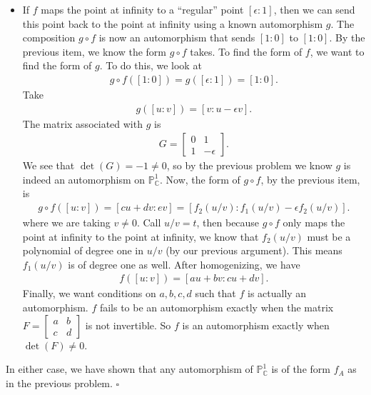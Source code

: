 \documentclass[12pt]{article}
\newcommand{\C}{\mathbb{C}}
\begin{document}
\begin{itemize}
\item If $f$ maps the point at infinity to a ``regular'' point $[\epsilon:1]$, then we can send this point back to the point at infinity using a known automorphism $g$. The composition $g\circ f$ is now an automorphism that sends $[1:0]$ to $[1:0]$. By the previous item, we know the form $g\circ f$ takes. To find the form of $f$, we want to find the form of $g$. To do this, we look at
\begin{align*}
g\circ f([1:0]) = g([\epsilon : 1]) = [1:0].
\end{align*} 
Take 
\begin{align*}
g([u:v]) = [v : u - \epsilon v].
\end{align*}
The matrix associated with $g$ is 
\begin{align*}
G = \begin{bmatrix}
0 & 1 \\ 1 & -\epsilon
\end{bmatrix}.
\end{align*}
We see that $\det(G) = -1 \neq 0$, so by the previous problem we know $g$ is indeed an automorphism on $\mathbb{P}^1_\C$. Now, the form of $g\circ f$, by the previous item, is 
\begin{align*}
g\circ f([u:v]) = [cu + dv : ev] = [f_2(u/v) : f_1(u/v) - \epsilon f_2(u/v)].
\end{align*}
where we are taking $v\neq 0$. Call $u/v= t$, then because $g\circ f$ only maps the point at infinity to the point at infinity, we know that $f_2(u/v)$ must be a polynomial of degree one in $u/v$ (by our previous argument). This means $f_1(u/v)$ is of degree one as well. After homogenizing, we have
\begin{align*}
f([u:v]) = [au+bv : cu + dv].
\end{align*}
Finally, we want conditions on $a,b,c,d$ such that $f$ is actually an automorphism. $f$ fails to be an automorphism exactly when the matrix $F = \begin{bmatrix}
a&b\\c&d
\end{bmatrix}$ is not invertible. So $f$ is an automorphism exactly when $\det(F) \neq 0$.
\end{itemize}

In either case, we have shown that any automorphism of $\mathbb{P}^1_\C$ is of the form $f_A$ as in the previous problem. \hfill $\square$   




 




	
\end{document}
